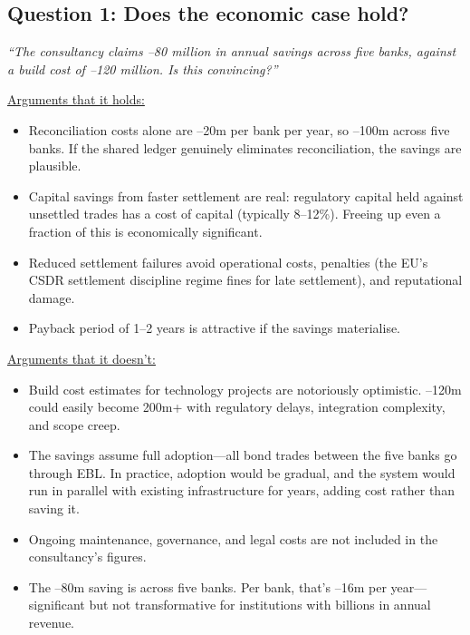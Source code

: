 \documentclass[11pt]{article}
\begin{document}
\subsection*{Question 1: Does the economic case hold?}

\textit{``The consultancy claims --80 million in annual savings across five banks, against a build cost of --120 million. Is this convincing?''}

\medskip
\noindent\underline{Arguments that it holds:}
\begin{itemize}[leftmargin=*]
\item Reconciliation costs alone are --20m per bank per year, so --100m across five banks. If the shared ledger genuinely eliminates reconciliation, the savings are plausible.
\item Capital savings from faster settlement are real: regulatory capital held against unsettled trades has a cost of capital (typically 8--12\%). Freeing up even a fraction of this is economically significant.
\item Reduced settlement failures avoid operational costs, penalties (the EU's CSDR settlement discipline regime fines for late settlement), and reputational damage.
\item Payback period of 1--2 years is attractive if the savings materialise.
\end{itemize}

\medskip
\noindent\underline{Arguments that it doesn't:}
\begin{itemize}[leftmargin=*]
\item Build cost estimates for technology projects are notoriously optimistic. --120m could easily become \texteuro 200m+ with regulatory delays, integration complexity, and scope creep.
\item The savings assume full adoption---all bond trades between the five banks go through EBL. In practice, adoption would be gradual, and the system would run in parallel with existing infrastructure for years, adding cost rather than saving it.
\item Ongoing maintenance, governance, and legal costs are not included in the consultancy's figures.
\item The --80m saving is across five banks. Per bank, that's --16m per year---significant but not transformative for institutions with billions in annual revenue.
\end{itemize}
\end{document}
